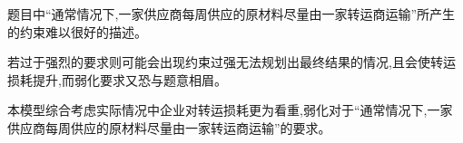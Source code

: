 题目中“通常情况下,一家供应商每周供应的原材料尽量由一家转运商运输”所产生的约束难以很好的描述。

若过于强烈的要求则可能会出现约束过强无法规划出最终结果的情况,且会使转运损耗提升,而弱化要求又恐与题意相眉。

本模型综合考虑实际情况中企业对转运损耗更为看重,弱化对于“通常情况下,一家供应商每周供应的原材料尽量由一家转运商运输”的要求。


